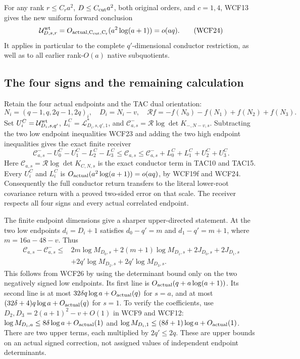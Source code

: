 For any rank $r\le C_r a^2$, $D\le C_{\rm cut}a^2$, both original orders,
and $c=1,4$, WCF13 gives the new uniform forward conclusion
\[
 \mathcal U^{\rm wt}_{D,s,r}=O_{\rm actual,C_{\rm cut},C_r}(a^2\log(a+1))
                            =o(aq).
 \tag{WCF24}
\]
It applies in particular to the complete $q'$-dimensional conductor
restriction, as well as to all earlier rank-$O(a)$ native subquotients.

\subsection{The four signs and the remaining calculation}

Retain the four actual endpoints and the TAC dual orientation:
\[
 N_i=(q-1,q,2q-1,2q)_i,\quad D_i=N_i-v,\quad
 \mathcal R f=-f(N_0)-f(N_1)+f(N_2)+f(N_3).
 \tag{WCF25}
\]
Set $U_i^C=\mathcal U^{\rm wt}_{D_i,s,q'}$,
$L_i^C=\mathcal L_{D_i,s,q',1}^*$, and
$\mathcal C^-_{a,s}=\mathcal R\log\det K_{-,N-v,s}$.
Subtracting the two low endpoint inequalities WCF23 and adding the
two high endpoint inequalities gives the exact finite receiver
\[
 \boxed{\quad
 \mathcal C^-_{a,s}-U_0^C-U_1^C-L_2^C-L_3^C
 \le\mathcal C_{a,s}
 \le\mathcal C^-_{a,s}+L_0^C+L_1^C+U_2^C+U_3^C.
 \quad}\tag{WCF26}
\]
Here $\mathcal C_{a,s}=\mathcal R\log\det K_{C,N,s}$ is the exact
conductor term in TAC10 and TAC15. Every $U_i^C$ and $L_i^C$ is
$O_{\rm actual}(a^2\log(a+1))=o(aq)$, by WCF19f and WCF24.
Consequently the full conductor return transfers to the literal
lower-root covariance return with a proved two-sided error on that
scale. The receiver respects all four signs and every actual correlated
endpoint.

The finite endpoint dimensions give a sharper upper-directed statement.
At the two low endpoints $d_i=D_i+1$ satisfies
$d_0-q'=m$ and $d_1-q'=m+1$, where $m=16a-48-v$. Thus
\[
 \begin{split}
 \mathcal C_{a,s}-\mathcal C^-_{a,s}
 \le{}&2m\log M_{D_0,s}+2(m+1)\log M_{D_1,s}
            +2J_{D_0,s}+2J_{D_1,s}\\
       &+2q'\log M_{D_2,s}+2q'\log M_{D_3,s}.
 \end{split}\tag{WCF26a}
\]
This follows from WCF26 by using the determinant bound only on the
two negatively signed low endpoints. Its first line is
$O_{\rm actual}(q+a\log(a+1))$. Its second line is at most
$32\delta q\log a+O_{\rm actual}(q)$ for $s=a$, and at most
$(32\delta+4)q\log a+O_{\rm actual}(q)$ for $s=1$. To verify the
coefficients, use $D_2,D_3=2(a+1)^2-v+O(1)$ in WCF9 and WCF12:
$\log M_{D_i,a}\le8\delta\log a+O_{\rm actual}(1)$ and
$\log M_{D_i,1}\le(8\delta+1)\log a+O_{\rm actual}(1)$.
There are two upper terms, each multiplied by $2q'\le2q$.
These are upper bounds on an actual signed correction, not assigned
values of independent endpoint determinants.

